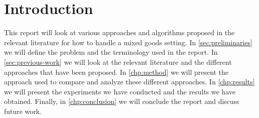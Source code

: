 \chapter{Introduction}\label{chp:introduction}

This report will look at various approaches and algorithms proposed in the relevant literature for how to handle a mixed goods setting. In \autoref{sec:preliminaries} we will define the problem and the terminology used in the report. In \autoref{sec:previous-work} we will look at the relevant literature and the different approaches that have been proposed. In \autoref{chp:method} we will present the approach used to compare and analyze these different approaches. In \autoref{chp:results} we will present the experiments we have conducted and the results we have obtained. Finally, in \autoref{chp:conclusion} we will conclude the report and discuss future work.

\clearpage

\clearpage
